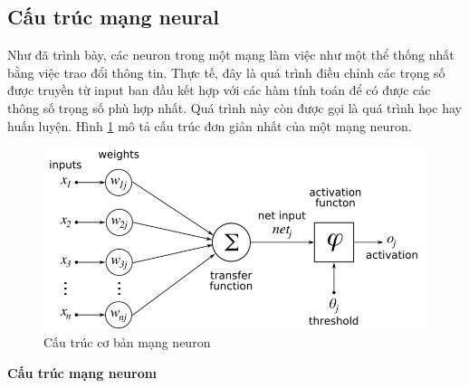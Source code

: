 	\subsection{Cấu trúc mạng neural}
	Như đã trình bày, các neuron trong một mạng làm việc như một thể thống nhất bằng việc trao đổi thông tin. Thực tế, đây là quá trình điều chỉnh các trọng số được truyền từ input ban đầu kết hợp với các hàm tính toán để có được các thông số trọng số phù hợp nhất. Quá trình này còn được gọi là quá trình học hay huấn luyện. Hình \ref{fig:NN} mô tả cấu trúc đơn giản nhất của một mạng neuron.
	\begin{figure}[h!]
		\centering
		\includegraphics[scale=0.4]{charts/NN.png}
		\caption{Cấu trúc cơ bản mạng neuron\cite{img-perceptron}}
		\label{fig:NN}
	\end{figure}
	
	\textbf{Cấu trúc mạng neuron\i}
	
